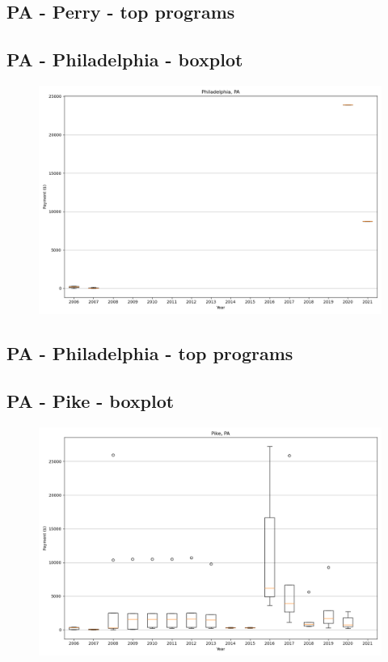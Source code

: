 \subsection*{PA - Perry - top programs}

\newpage
\subsection*{PA - Philadelphia - boxplot}
\begin{figure}[h]
\centering
\includegraphics[width=7in]{../output/boxplots/counties/Philadelphia-PA_boxplot.png}
\end{figure}


\subsection*{PA - Philadelphia - top programs}

\newpage
\subsection*{PA - Pike - boxplot}
\begin{figure}[h]
\centering
\includegraphics[width=7in]{../output/boxplots/counties/Pike-PA_boxplot.png}
\end{figure}


